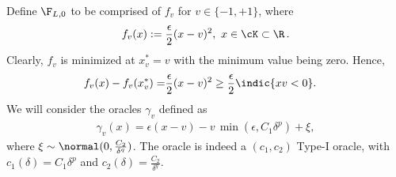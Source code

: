 Define $\F_{L,0}$ to be comprised of $f_v$ for $v \in \{-1,+1\}$, where
\begin{align*}
  f_v(x) := \dfrac{\epsilon}{2} (x - v)^2, \,\, x \in \cK \subset \R\,.
\end{align*}
Clearly, $f_v$ is minimized at $x^*_v = v$ with the minimum value being zero.
Hence,
\begin{align}
  f_v(x) - f_v(x^*_v)
  = &  \dfrac{\epsilon}{2} (x - v)^2 \ge  \dfrac{\epsilon}{2}  \indic{x v  < 0}. \label{eq:main:fv-lb-main}
\end{align}
We will consider the oracles $\gamma_v$ defined as
\begin{align}
 \gamma_v(x) = \epsilon(x-v) - v\, \min(\epsilon,C_1 \delta^p) + \xi, \label{eq:main:oracle-1d}
\end{align}
where $\xi \sim \normal(0,\frac{C_2}{\delta^q})$.
The oracle is indeed a $(c_1,c_2)$ Type-I oracle, with $c_1(\delta)=C_1\delta^p$ and $c_2(\delta)=\frac{C_2}{\delta^q}$.

